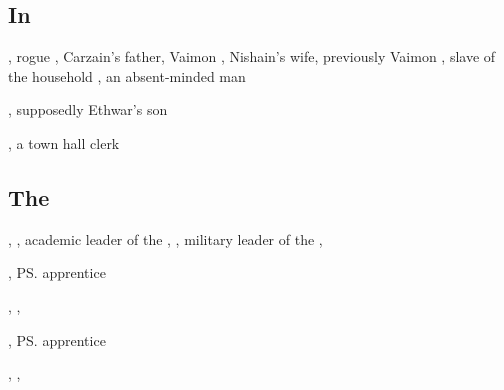\subsection{In \Redglen}
\begin{dramatispersonae}
  \dramitem[Carzain]{\CarzainDeracilleShireyo}
    {\human}{\male}, 
    rogue  
  , 
    Carzain's father,  Vaimon
    {\human}{\female}, 
    Nishain's wife, previously  Vaimon
  , 
    slave of the \Shireyo{} household
  , an absent-minded man
  \begin{subdramatispersonae}
    , 
      supposedly Ethwar's son
  \end{subdramatispersonae}
  \dramitem[Symeon]{\Symeon}{\scatha}{\male}, a town hall clerk
\end{dramatispersonae}

\subsection[The Ishrah]{The }
\begin{dramatispersonae}
  ,
    ,
    academic leader of the \ishrah{}
  , 
     , 
    military leader of the \ishrah{}
  \dramitem[Onatol]{\Ambrose\ \Anatoli}{\scatha}{\male},
  \begin{subdramatispersonae}
    , \ps{\Onatol} apprentice
  \end{subdramatispersonae}
  , {\Telcra} {\templar}
  \dramitem[Sanyor]{\Sanyor}{\scatha}{\male}, {\Telcra} \templar{}
  \begin{subdramatispersonae}
    , \ps{\Sanyor} apprentice
  \end{subdramatispersonae}
  , {\Telcra} \templar{}
  , {\Telcra} \templar{}
\end{dramatispersonae}


